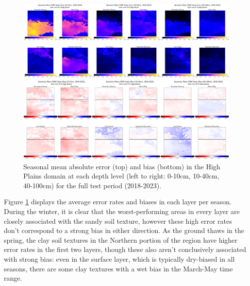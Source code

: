 \begin{figure}[H]
    \centering

    \includegraphics[width=.98\linewidth,draft=false]{figures/lt-high-plains/eval-grid_lt-high-plains_lstm-rsm-9_pixelwise-time-stats_abs-err_qtrly-err-state-all-3.png}

    \includegraphics[width=.98\linewidth,draft=false]{figures/lt-high-plains/eval-grid_lt-high-plains_lstm-rsm-9_pixelwise-time-stats_bias_qtrly-err-state-all-3.png}

    \caption{Seasonal mean absolute error (top) and bias (bottom) in the High Plains domain at each depth level (left to right: 0-10cm, 10-40cm, 40-100cm) for the full test period (2018-2023).}
    \label{lt_mae-bias_high-plains}
\end{figure}

Figure \ref{lt_mae-bias_high-plains} displays the average error rates and biases in each layer per season. During the winter, it is clear that the worst-performing areas in every layer are closely associated with the sandy soil texture, however these high error rates don't correspond to a strong bias in either direction. As the ground thaws in the spring, the clay soil textures in the Northern portion of the region have higher error rates in the first two layers, though these also aren't conclusively associated with strong bias: even in the surface layer, which is typically dry-biased in all seasons, there are some clay textures with a wet bias in the March-May time range.

